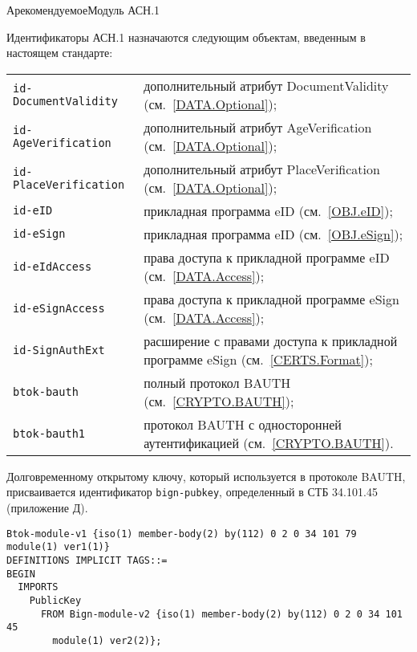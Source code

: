 \begin{appendix}{А}{рекомендуемое}{Модуль АСН.1}
\label{ASN}

\mbox{}


Идентификаторы АСН.1 назначаются следующим объектам, введенным в настоящем стандарте:
\begin{center}
\begin{tabular}{p{4.5cm}p{11.5cm}}
\verb|id-DocumentValidity| &
дополнительный атрибут DocumentValidity (см.~\ref{DATA.Optional});\\
%
\verb|id-AgeVerification| &
дополнительный атрибут AgeVerification (см.~\ref{DATA.Optional});\\
%
\verb|id-PlaceVerification| &
дополнительный атрибут PlaceVerification (см.~\ref{DATA.Optional});\\
%
\verb|id-eID| &
прикладная программа eID (см.~\ref{OBJ.eID});\\
%
\verb|id-eSign| &
прикладная программа eID (см.~\ref{OBJ.eSign});\\
%
\verb|id-eIdAccess| &
права доступа к прикладной программе eID 
(см.~\ref{DATA.Access});\\
%
\verb|id-eSignAccess| &
права доступа к прикладной программе eSign 
(см.~\ref{DATA.Access});\\
%
\verb|id-SignAuthExt| &
расширение с правами доступа к прикладной программе eSign 
(см.~\ref{CERTS.Format});\\
%
\verb|btok-bauth| &
полный протокол BAUTH 
(см.~\ref{CRYPTO.BAUTH});\\
%
\verb|btok-bauth1| &
протокол BAUTH с односторонней аутентификацией
(см.~\ref{CRYPTO.BAUTH}).\\
\end{tabular}
\end{center}

Долговременному открытому ключу, который используется в протоколе 
BAUTH, присваивается идентификатор \verb|bign-pubkey|, определенный в СТБ 
34.101.45 (приложение Д).



\begin{verbatim}
Btok-module-v1 {iso(1) member-body(2) by(112) 0 2 0 34 101 79 module(1) ver1(1)}
DEFINITIONS IMPLICIT TAGS::=
BEGIN
  IMPORTS 
    PublicKey 
      FROM Bign-module-v2 {iso(1) member-body(2) by(112) 0 2 0 34 101 45 
        module(1) ver2(2)};


\end{verbatim}
\end{appendix}
